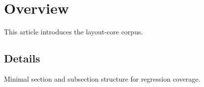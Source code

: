 \documentclass{article}
\begin{document}
\section{Overview}
This article introduces the layout-core corpus.

\subsection{Details}
Minimal section and subsection structure for regression coverage.
\end{document}
